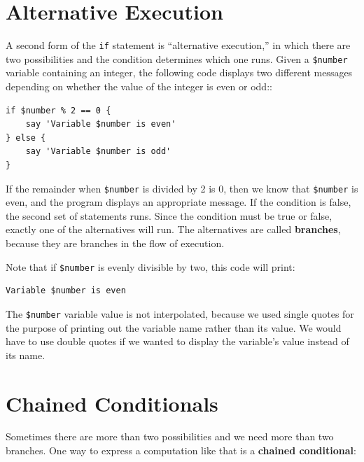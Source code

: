 \section{Alternative Execution}
\label{alternative.execution}

A second form of the {\tt if} statement is ``alternative execution,'' 
in which there are two possibilities and the condition determines
which one runs.  Given a \verb'$number' variable containing an 
integer, the following code displays two different messages 
depending on whether the value of the integer is even or odd::

\begin{verbatim}
if $number % 2 == 0 {
    say 'Variable $number is even'
} else {
    say 'Variable $number is odd'
}
\end{verbatim}
%
If the remainder when {\tt \$number} is divided by 2 is 0, 
then we know that {\tt \$number} is even, and the program 
displays an appropriate message.  If
the condition is false, the second set of statements runs.
Since the condition must be true or false, exactly one of the
alternatives will run.  The alternatives are called 
{\bf branches}, because they are branches in the flow of 
execution.

Note that if \verb'$number' is evenly divisible by two, 
this code will print:

\begin{verbatim} 
Variable $number is even
\end{verbatim}

The \verb'$number' variable value is not interpolated, 
because we used single quotes for the purpose 
of printing out the variable name rather 
than its value. We would have to use double quotes if 
we wanted to display the variable's value instead of its 
name.


\section{Chained Conditionals}

Sometimes there are more than two possibilities and we need more than
two branches.  One way to express a computation like that is a 
{\bf chained conditional}:

